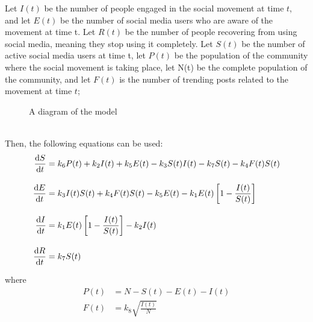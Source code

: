 \documentclass{article}
\begin{document}
     Let $I(t)$ be the number of people engaged in the social movement at time $t$, and let $E(t)$ be the number of social media users who are aware of the movement at time t. Let $R(t)$ be the number of people recovering from using social media, meaning they stop using it completely. Let $S(t)$ be the number of active social media users at time t, let $P(t)$ be the population of the community where the social movement is taking place, let N(t) be the complete population of the community, and let $F(t)$ is the number of trending posts related to the movement at time $t$;\\
     \begin{figure}
         \centering
        \caption{A diagram of the model}
    \end{figure}
    \\
    Then, the following equations can be used:
    \begin{subequations}
    \begin{align}            
        \diff St &= k_6 P(t) + k_2I(t) + k_5E(t) - k_3 {S(t)I(t)}- k_7S(t)-k_4 F(t)S(t)
        \\[10pt]
        \diff Et &= k_3 I(t)S(t) + k_4 F(t) S(t) - k_5E(t) - k_1E(t)\left[1 - \frac{I(t)}{S(t)}\right] 
        \\[10pt]
        \diff It &= k_1 E(t) \left[1 - \frac{I(t)}{S(t)}\right] - k_2I(t)
        \\[10pt]
        \diff Rt &= k_7S(t)
    \end{align}
    \end{subequations}
    
    where
    \begin{subequations}
    \begin{align}
        P(t) &= N - S(t) - E(t) - I(t)
        \\[10pt]
        F(t) &= k_8\sqrt{\frac{I(t)} N}
    \end{align}
    \end{subequations}
\end{document}
